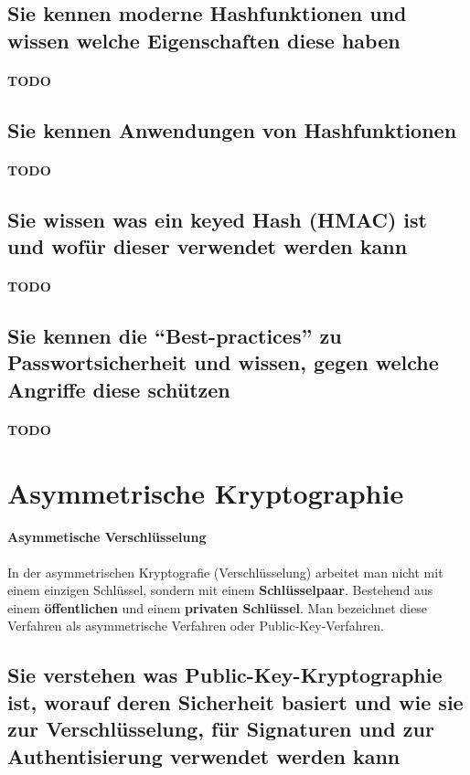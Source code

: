 \documentclass[10pt,a4paper]{article}
\begin{document}
\subsection*{Sie kennen moderne Hashfunktionen und wissen welche Eigenschaften diese haben}
\paragraph*{TODO}

\subsection*{Sie kennen Anwendungen von Hashfunktionen}
\paragraph*{TODO}

\subsection*{Sie wissen was ein keyed Hash (HMAC) ist und wofür dieser verwendet werden kann}
\paragraph*{TODO}

\subsection*{Sie kennen die "`Best-practices"' zu Passwortsicherheit und wissen, gegen welche Angriffe diese schützen}
\paragraph*{TODO}

\section{Asymmetrische Kryptographie}
\paragraph*{Asymmetische Verschlüsselung}In der asymmetrischen Kryptografie (Verschlüsselung) arbeitet man nicht mit einem einzigen Schlüssel, sondern mit einem \textbf{Schlüsselpaar}. Bestehend aus einem \textbf{öffentlichen} und einem \textbf{privaten Schlüssel}. Man bezeichnet diese Verfahren als asymmetrische Verfahren oder \mbox{Public-Key-Verfahren}.
\subsection*{Sie verstehen was Public-Key-Kryptographie ist, worauf deren Sicherheit basiert und wie sie zur Verschlüsselung, für Signaturen und zur Authentisierung verwendet werden kann}
\end{document}
